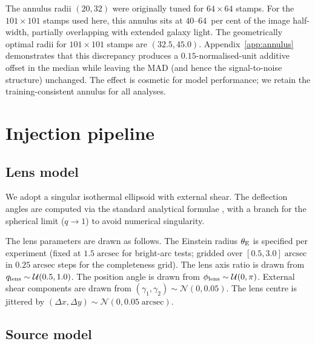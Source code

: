 \documentclass[fleqn,usenatbib]{mnras}
\begin{document}
The annulus radii $(20, 32)$ were originally tuned for $64 \times 64$ stamps.  For the $101 \times 101$ stamps used here, this annulus sits at $40$--$64$~per cent of the image half-width, partially overlapping with extended galaxy light.  The geometrically optimal radii for $101 \times 101$ stamps are $(32.5, 45.0)$.  Appendix~\ref{app:annulus} demonstrates that this discrepancy produces a $0.15$-normalised-unit additive offset in the median while leaving the MAD (and hence the signal-to-noise structure) unchanged.  The effect is cosmetic for model performance; we retain the training-consistent annulus for all analyses.


\section{Injection pipeline}

\subsection{Lens model}

We adopt a singular isothermal ellipsoid \citep[SIE;][]{Kormann1994} with external shear.  The deflection angles are computed via the standard analytical formulae \citep{Keeton2001}, with a branch for the spherical limit ($q \to 1$) to avoid numerical singularity.

The lens parameters are drawn as follows.  The Einstein radius $\theta_{\rm E}$ is specified per experiment (fixed at $1.5\;\mathrm{arcsec}$ for bright-arc tests; gridded over $[0.5, 3.0]\;\mathrm{arcsec}$ in $0.25\;\mathrm{arcsec}$ steps for the completeness grid).  The lens axis ratio is drawn from $q_{\rm lens} \sim \mathcal{U}(0.5, 1.0)$.  The position angle is drawn from $\phi_{\rm lens} \sim \mathcal{U}(0, \pi)$.  External shear components are drawn from $(\gamma_1, \gamma_2) \sim \mathcal{N}(0, 0.05)$.  The lens centre is jittered by $(\Delta x, \Delta y) \sim \mathcal{N}(0, 0.05\;\mathrm{arcsec})$.

\subsection{Source model}
\end{document}

